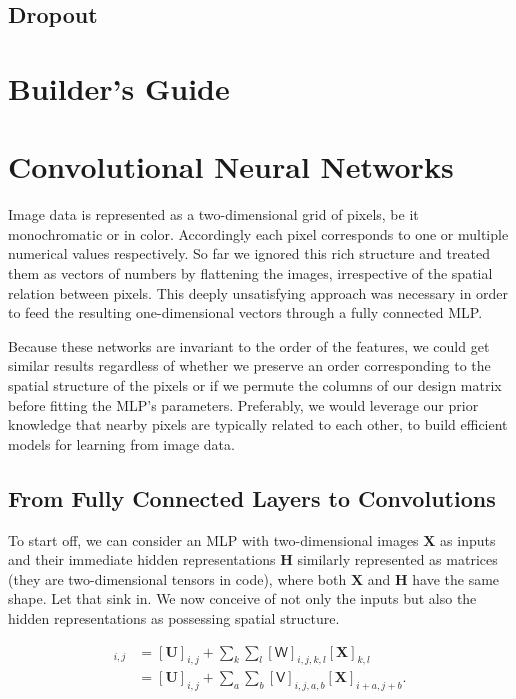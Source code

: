 \documentclass[a4paper,12pt]{article}
\theoremstyle{definition}
\begin{document}
\subsection*{Dropout}

\section{Builder's Guide}

\section{Convolutional Neural Networks}
Image data is represented as a two-dimensional grid of pixels, be it monochromatic or in color. Accordingly each pixel corresponds to one or multiple numerical values
respectively. So far we ignored this rich structure and treated them as vectors of numbers by flattening the images, irrespective of the spatial relation between pixels.
This deeply unsatisfying approach was necessary in order to feed the resulting one-dimensional vectors through a fully connected MLP.

Because these networks are invariant to the order of the features, we could get similar results regardless of whether we preserve an order corresponding to the spatial
structure of the pixels or if we permute the columns of our design matrix before fitting the MLP’s parameters. Preferably, we would leverage our prior knowledge that
nearby pixels are typically related to each other, to build efficient models for learning from image data.
\subsection{From Fully Connected Layers to Convolutions}

To start off, we can consider an MLP with two-dimensional images $\mathbf{X}$ as inputs and their immediate hidden representations $\mathbf{H}$  similarly represented
as matrices (they are two-dimensional tensors in code), where both $\mathbf{X}$ and $\mathbf{H}$ have the same shape. Let that sink in. We now conceive of not only the
inputs but also the hidden representations as possessing spatial structure.



\begin{align*}
    [\mathbf{H}]_{i, j} & = [\mathbf{U}]_{i, j} + \sum_k \sum_l[\mathsf{W}]_{i, j, k, l}  [\mathbf{X}]_{k, l} \\ &=  [\mathbf{U}]_{i, j} +
    \sum_a \sum_b [\mathsf{V}]_{i, j, a, b}  [\mathbf{X}]_{i+a, j+b}.
\end{align*}
\end{document}
